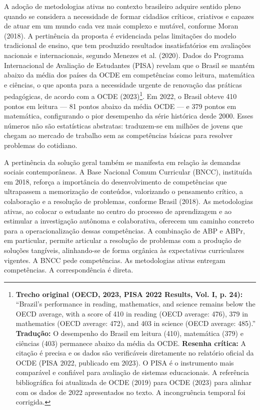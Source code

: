 A adoção de metodologias ativas no contexto brasileiro adquire sentido pleno quando se considera a necessidade de formar cidadãos críticos, criativos e capazes de atuar em um mundo cada vez mais complexo e mutável, conforme Moran (2018). A pertinência da proposta é evidenciada pelas limitações do modelo tradicional de ensino, que tem produzido resultados insatisfatórios em avaliações nacionais e internacionais, segundo Menezes et al. (2020). Dados do Programa Internacional de Avaliação de Estudantes (PISA) revelam que o Brasil se mantém abaixo da média dos países da OCDE em competências como leitura, matemática e ciências, o que aponta para a necessidade urgente de renovação das práticas pedagógicas, de acordo com a OCDE (2023)\footnote{\textbf{Trecho original (OECD, 2023, PISA 2022 Results, Vol. I, p. 24):} ``Brazil's performance in reading, mathematics, and science remains below the OECD average, with a score of 410 in reading (OECD average: 476), 379 in mathematics (OECD average: 472), and 403 in science (OECD average: 485).'' \textbf{Tradução:} O desempenho do Brasil em leitura (410), matemática (379) e ciências (403) permanece abaixo da média da OCDE. \textbf{Resenha crítica:} A citação é precisa e os dados são verificáveis diretamente no relatório oficial da OCDE (PISA 2022, publicado em 2023). O PISA é o instrumento mais comparável e confiável para avaliação de sistemas educacionais. A referência bibliográfica foi atualizada de OCDE (2019) para OCDE (2023) para alinhar com os dados de 2022 apresentados no texto. A incongruência temporal foi corrigida.}. Em 2022, o Brasil obteve 410 pontos em leitura — 81 pontos abaixo da média OCDE — e 379 pontos em matemática, configurando o pior desempenho da série histórica desde 2000. Esses números não são estatísticas abstratas: traduzem-se em milhões de jovens que chegam ao mercado de trabalho sem as competências básicas para resolver problemas do cotidiano.

A pertinência da solução geral também se manifesta em relação às demandas sociais contemporâneas. A Base Nacional Comum Curricular (BNCC), instituída em 2018, reforça a importância do desenvolvimento de competências que ultrapassem a memorização de conteúdos, valorizando o pensamento crítico, a colaboração e a resolução de problemas, conforme Brasil (2018). As metodologias ativas, ao colocar o estudante no centro do processo de aprendizagem e ao estimular a investigação autônoma e colaborativa, oferecem um caminho concreto para a operacionalização dessas competências. A combinação de ABP e ABPr, em particular, permite articular a resolução de problemas com a produção de soluções tangíveis, alinhando-se de forma orgânica às expectativas curriculares vigentes. A BNCC pede competências. As metodologias ativas entregam competências. A correspondência é direta.


